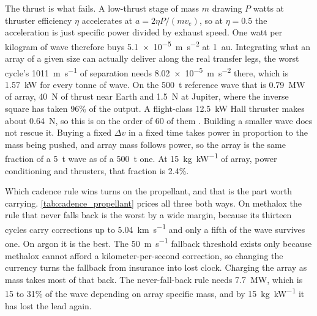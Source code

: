 \documentclass{article}
\newcommand{\deltav}{\Delta v}
\begin{document}
The thrust is what fails. A low-thrust stage of mass $m$ drawing $P$ watts at thruster efficiency $\eta$ accelerates at $a = 2\eta P/(m v_e)$, so at $\eta = 0.5$ the acceleration is just specific power divided by exhaust speed. One watt per kilogram of wave therefore buys \SI{5.1e-5}{\meter\per\second\squared} at \SI{1}{\astronomicalunit}. Integrating what an array of a given size can actually deliver along the real transfer legs, the worst cycle's \SI{1011}{\meter\per\second} of separation needs \SI{8.02e-5}{\meter\per\second\squared} there, which is \SI{1.57}{\kilo\watt} for every tonne of wave. On the \SI{500}{\tonne} reference wave that is \SI{0.79}{\mega\watt} of array, \SI{40}{\newton} of thrust near Earth and \SI{1.5}{\newton} at Jupiter, where the inverse square has taken 96\% of the output. A flight-class \SI{12.5}{\kilo\watt} Hall thruster makes about \SI{0.64}{\newton}, so this is on the order of 60 of them \cite{Katz_aim_is_all_you_need_2025}. Building a smaller wave does not rescue it. Buying a fixed \(\deltav\) in a fixed time takes power in proportion to the mass being pushed, and array mass follows power, so the array is the same fraction of a \SI{5}{\tonne} wave as of a \SI{500}{\tonne} one. At \SI{15}{\kilo\gram\per\kilo\watt} of array, power conditioning and thrusters, that fraction is 2.4\%.

Which cadence rule wins turns on the propellant, and that is the part worth carrying. \autoref{tab:cadence_propellant} prices all three both ways. On methalox the rule that never falls back is the worst by a wide margin, because its thirteen cycles carry corrections up to \SI{5.04}{\kilo\meter\per\second} and only a fifth of the wave survives one. On argon it is the best. The \SI{50}{\meter\per\second} fallback threshold exists only because methalox cannot afford a kilometer-per-second correction, so changing the currency turns the fallback from insurance into lost clock. Charging the array as mass takes most of that back. The never-fall-back rule needs \SI{7.7}{\mega\watt}, which is 15 to 31\% of the wave depending on array specific mass, and by \SI{15}{\kilo\gram\per\kilo\watt} it has lost the lead again.
\end{document}
